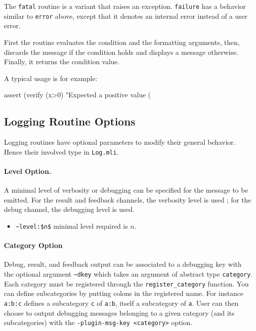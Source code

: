 \begin{description}
  The \lstinline{fatal} routine is a variant that raises an exception.
  \lstinline{failure} has a behavior similar to \lstinline{error} above,
  except that it denotes an internal error instead of a user error.

  First the routine evaluates the condition and the formatting
  arguments, then, discards the message if the condition holds and
  displays a message otherwise. Finally, it returns the condition value.

  A typical usage is for example:
  \begin{ocamlcode}
    assert (verify (x>0) "Expected a positive value (%
  \end{ocamlcode}

\end{description}

\subsection{Logging Routine Options}

Logging routines have optional parameters to modify their general
behavior. Hence their involved type in \texttt{Log.mli}.

\paragraph{Level Option.} A minimal level of verbosity or debugging can be
specified for the message to be emitted. For the result and feedback
channels, the verbosity level is used ; for the debug channel, the
debugging level is used.
\begin{itemize}
\item[] \lstinline{~level:$n$} minimal level required is $n$.
\end{itemize}

\paragraph{Category Option} Debug, result, and feedback
output can be associated to a debugging key with the optional argument
\lstinline{~dkey} which takes an argument of abstract type
\lstinline|category|.
Each category must be registered through the
\lstinline|register_category| function. You can define subcategories
by putting colons in the registered name. For instance \lstinline|a:b:c| defines
a subcategory \lstinline|c| of \lstinline|a:b|, itself a subcategory of
\lstinline|a|. User can then choose to
output debugging messages belonging to a given category (and its subcategories)
with the \lstinline{-plugin-msg-key <category>} option.


